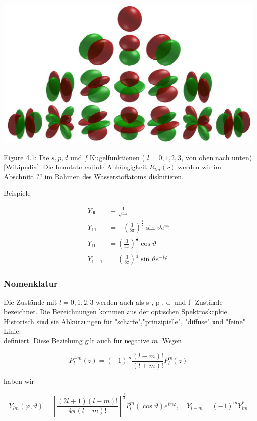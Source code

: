 \documentclass[10pt, letterpaper]{article}
\begin{document}
\begin{center}
\includegraphics[scale=0.2]{2025_05_21_5017aafc65fbb33f9443g-12}
\end{center}

Figure 4.1: Die $s, p, d$ und $f$ Kugelfunktionen ( $l=0,1,2,3$, von oben nach unten) [Wikipedia]. Die benutzte radiale Abhängigkeit $R_{l m}(r)$ werden wir im Abschnitt ?? im Rahmen des Wasserstoffatoms diskutieren.

Beispiele

$$
\begin{aligned}
Y_{00} & =\frac{1}{\sqrt{4 \pi}} \\
Y_{11} & =-\left(\frac{3}{8 \pi}\right)^{\frac{1}{2}} \sin \vartheta e^{i \varphi} \\
Y_{10} & =\left(\frac{3}{4 \pi}\right)^{\frac{1}{2}} \cos \vartheta \\
Y_{1-1} & =\left(\frac{3}{8 \pi}\right)^{\frac{1}{2}} \sin \vartheta e^{-i \varphi}
\end{aligned}
$$

\subsubsection*{Nomenklatur}
Die Zustände mit $l=0,1,2,3$ werden auch als s-, p-, d- und f- Zustände bezeichnet. Die Bezeichnungen kommen aus der optischen Spektroskopkie. Historisch sind sie Abkürzungen für "scharfe","prinzipielle", "diffuse" und "feine" Linie.\\
definiert. Diese Beziehung gilt auch für negative $m$. Wegen

$$
P_{l}^{-m}(z)=(-1)^{m} \frac{(l-m)!}{(l+m)!} P_{l}^{m}(z)
$$

haben wir

$$
Y_{l m}(\varphi, \vartheta)=\left[\frac{(2 l+1)(l-m)!}{4 \pi(l+m)!}\right]^{\frac{1}{2}} P_{l}^{m}(\cos \vartheta) e^{i m \varphi}, \quad Y_{l-m}=(-1)^{m} Y_{l m}^{*}
$$
\end{document}
